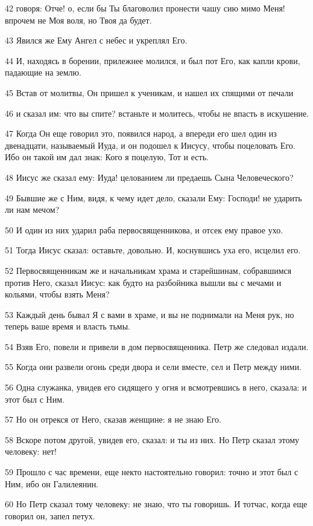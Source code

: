 \par 42 говоря: Отче! о, если бы Ты благоволил пронести чашу сию мимо Меня! впрочем не Моя воля, но Твоя да будет.
\par 43 Явился же Ему Ангел с небес и укреплял Его.
\par 44 И, находясь в борении, прилежнее молился, и был пот Его, как капли крови, падающие на землю.
\par 45 Встав от молитвы, Он пришел к ученикам, и нашел их спящими от печали
\par 46 и сказал им: что вы спите? встаньте и молитесь, чтобы не впасть в искушение.
\par 47 Когда Он еще говорил это, появился народ, а впереди его шел один из двенадцати, называемый Иуда, и он подошел к Иисусу, чтобы поцеловать Его. Ибо он такой им дал знак: Кого я поцелую, Тот и есть.
\par 48 Иисус же сказал ему: Иуда! целованием ли предаешь Сына Человеческого?
\par 49 Бывшие же с Ним, видя, к чему идет дело, сказали Ему: Господи! не ударить ли нам мечом?
\par 50 И один из них ударил раба первосвященникова, и отсек ему правое ухо.
\par 51 Тогда Иисус сказал: оставьте, довольно. И, коснувшись уха его, исцелил его.
\par 52 Первосвященникам же и начальникам храма и старейшинам, собравшимся против Него, сказал Иисус: как будто на разбойника вышли вы с мечами и кольями, чтобы взять Меня?
\par 53 Каждый день бывал Я с вами в храме, и вы не поднимали на Меня рук, но теперь ваше время и власть тьмы.
\par 54 Взяв Его, повели и привели в дом первосвященника. Петр же следовал издали.
\par 55 Когда они развели огонь среди двора и сели вместе, сел и Петр между ними.
\par 56 Одна служанка, увидев его сидящего у огня и всмотревшись в него, сказала: и этот был с Ним.
\par 57 Но он отрекся от Него, сказав женщине: я не знаю Его.
\par 58 Вскоре потом другой, увидев его, сказал: и ты из них. Но Петр сказал этому человеку: нет!
\par 59 Прошло с час времени, еще некто настоятельно говорил: точно и этот был с Ним, ибо он Галилеянин.
\par 60 Но Петр сказал тому человеку: не знаю, что ты говоришь. И тотчас, когда еще говорил он, запел петух.
